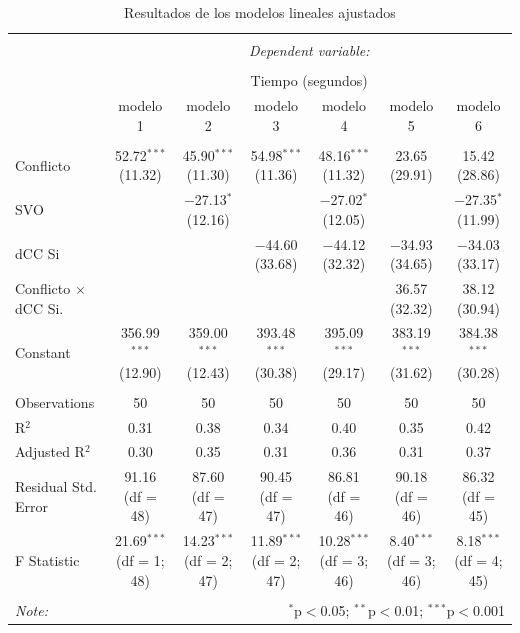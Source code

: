 \documentclass[
  spanish,
  10pt,
]{article}
\begin{document}
\begin{table}[H] \centering 
  \caption{Resultados de los modelos lineales ajustados} 
  \label{} 
\scriptsize 
\begin{tabular}{@{\extracolsep{5pt}}lcccccc} 
\\[-1.8ex]\hline 
\hline \\[-1.8ex] 
 & \multicolumn{6}{c}{\textit{Dependent variable:}} \\ 
\cline{2-7} 
\\[-1.8ex] & \multicolumn{6}{c}{Tiempo (segundos)} \\ 
 & modelo 1 & modelo 2 & modelo 3 & modelo 4 & modelo 5 & modelo 6 \\ 
\hline \\[-1.8ex] 
 Conflicto & 52.72$^{***}$ (11.32) & 45.90$^{***}$ (11.30) & 54.98$^{***}$ (11.36) & 48.16$^{***}$ (11.32) & 23.65 (29.91) & 15.42 (28.86) \\ 
  SVO &  & $-$27.13$^{*}$ (12.16) &  & $-$27.02$^{*}$ (12.05) &  & $-$27.35$^{*}$ (11.99) \\ 
  dCC Si &  &  & $-$44.60 (33.68) & $-$44.12 (32.32) & $-$34.93 (34.65) & $-$34.03 (33.17) \\ 
  Conflicto $\times$ dCC Si. &  &  &  &  & 36.57 (32.32) & 38.12 (30.94) \\ 
  Constant & 356.99$^{***}$ (12.90) & 359.00$^{***}$ (12.43) & 393.48$^{***}$ (30.38) & 395.09$^{***}$ (29.17) & 383.19$^{***}$ (31.62) & 384.38$^{***}$ (30.28) \\ 
 \hline \\[-1.8ex] 
Observations & 50 & 50 & 50 & 50 & 50 & 50 \\ 
R$^{2}$ & 0.31 & 0.38 & 0.34 & 0.40 & 0.35 & 0.42 \\ 
Adjusted R$^{2}$ & 0.30 & 0.35 & 0.31 & 0.36 & 0.31 & 0.37 \\ 
Residual Std. Error & 91.16 (df = 48) & 87.60 (df = 47) & 90.45 (df = 47) & 86.81 (df = 46) & 90.18 (df = 46) & 86.32 (df = 45) \\ 
F Statistic & 21.69$^{***}$ (df = 1; 48) & 14.23$^{***}$ (df = 2; 47) & 11.89$^{***}$ (df = 2; 47) & 10.28$^{***}$ (df = 3; 46) & 8.40$^{***}$ (df = 3; 46) & 8.18$^{***}$ (df = 4; 45) \\ 
\hline 
\hline \\[-1.8ex] 
\textit{Note:}  & \multicolumn{6}{r}{$^{*}$p$<$0.05; $^{**}$p$<$0.01; $^{***}$p$<$0.001} \\ 
\end{tabular} 
\end{table}
\end{document}
